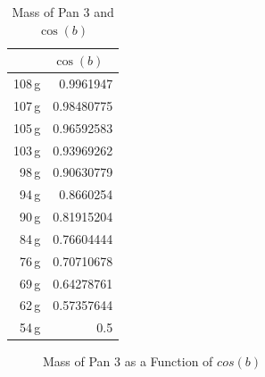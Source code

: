 \documentclass{article}
\begin{document}
\begin{table}[H]
    \centering
    \caption{Mass of Pan 3 and $\cos(b)$}
    \vspace{0.5em}
    \begin{tabular}{|r|r|}
        \hline
        \rowcolor{black}
        \multicolumn{1}{l}{\color{white} Mass (grams)} & \multicolumn{1}{l}{\color{white} $\cos(b)$} \\
        \hline
        108\,g           & 0.9961947       \\ 
        \hline
        107\,g           & 0.98480775       \\ 
        \hline
        105\,g           & 0.96592583       \\ 
        \hline
        103\,g           & 0.93969262       \\ 
        \hline
        98\,g           & 0.90630779       \\ 
        \hline
        94\,g           & 0.8660254       \\ 
        \hline
        90\,g           & 0.81915204       \\ 
        \hline
        84\,g           & 0.76604444       \\ 
        \hline
        76\,g           & 0.70710678       \\ 
        \hline
        69\,g           & 0.64278761       \\ 
        \hline
        62\,g           & 0.57357644       \\ 
        \hline
        54\,g            & 0.5      \\ 
        \hline
    \end{tabular}
\end{table}

\begin{figure}[H]
    \caption{Mass of Pan 3 as a Function of $cos(b)$}
    \vspace{0.5em}
    \centering
\end{figure}
\end{document}
